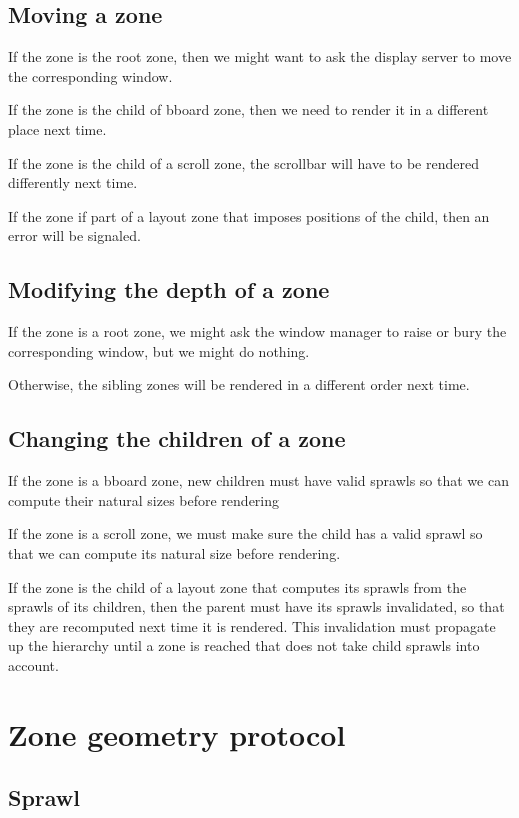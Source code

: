 \subsection{Moving a zone}

If the zone is the root zone, then we might want to ask the display
server to move the corresponding window. 

If the zone is the child of bboard zone, then we need to render it in
a different place next time. 

If the zone is the child of a scroll zone, the scrollbar will have
to be rendered differently next time. 

If the zone if part of a layout zone that imposes positions of the
child, then an error will be signaled. 

\subsection{Modifying the depth of a zone}

If the zone is a root zone, we might ask the window manager to raise
or bury the corresponding window, but we might do nothing. 

Otherwise, the sibling zones will be rendered in a different order
next time.

\subsection{Changing the children of a zone}

If the zone is a bboard zone, new children must have valid sprawls so
that we can compute their natural sizes before rendering

If the zone is a scroll zone, we must make sure the child has a
valid sprawl so that we can compute its natural size before rendering.

If the zone is the child of a layout zone that computes its sprawls from
the sprawls of its children, then the parent must have its sprawls
invalidated, so that they are recomputed next time it is rendered.
This invalidation must propagate up the hierarchy until a zone is
reached that does not take child sprawls into account. 

\section{Zone geometry protocol}

\subsection{Sprawl}
\label{sec-zone-protocols-geometry-sprawl}

